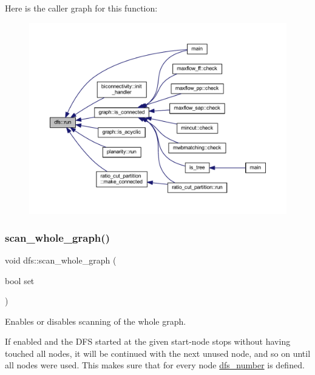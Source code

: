 Here is the caller graph for this function\+:
\nopagebreak
\begin{figure}[H]
\begin{center}
\leavevmode
\includegraphics[width=350pt]{classdfs_af0863b8974d5fd58cd0375c78ed8163b_icgraph}
\end{center}
\end{figure}
\mbox{\label{classdfs_aa7c864a6f3a120720138b187b3ed95b5}} 
\subsubsection{\texorpdfstring{scan\+\_\+whole\+\_\+graph()}{scan\_whole\_graph()}\hspace{0.1cm}{\footnotesize\ttfamily [1/2]}}
{\footnotesize\ttfamily void dfs\+::scan\+\_\+whole\+\_\+graph (\begin{DoxyParamCaption}\item[{bool}]{set }\end{DoxyParamCaption})\hspace{0.3cm}{\ttfamily [inline]}}



Enables or disables scanning of the whole graph. 

If enabled and the D\+FS started at the given start-\/node stops without having touched all nodes, it will be continued with the next unused node, and so on until all nodes were used. This makes sure that for every node \mbox{\hyperlink{classdfs_a99727f2274d6af63daae4f0518f3adbe}{dfs\+\_\+number}} is defined.

